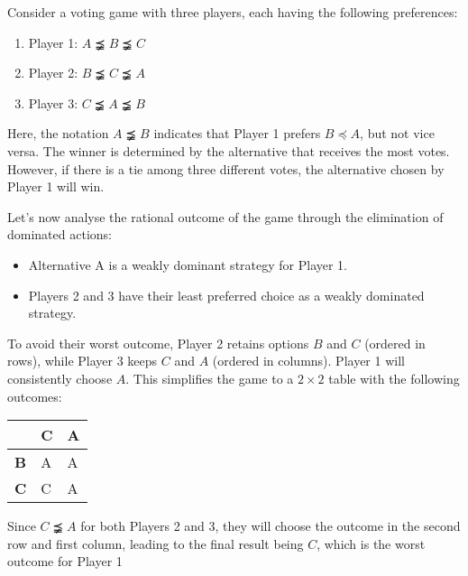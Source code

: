 \begin{example}
    Consider a voting game with three players, each having the following preferences:
    \begin{enumerate}
        \item Player 1: $A \precneqq B \precneqq C$
        \item Player 2: $B \precneqq C \precneqq A$
        \item Player 3: $C \precneqq A \precneqq B$
    \end{enumerate}
    Here, the notation $A \precneqq B$ indicates that Player 1 prefers $B \preceq A$, but not vice versa. 
    The winner is determined by the alternative that receives the most votes. 
    However, if there is a tie among three different votes, the alternative chosen by Player 1 will win.

    Let's now analyse the rational outcome of the game through the elimination of dominated actions:
    \begin{itemize}
        \item Alternative A is a weakly dominant strategy for Player 1.
        \item Players 2 and 3 have their least preferred choice as a weakly dominated strategy.
    \end{itemize}
    To avoid their worst outcome, Player 2 retains options $B$ and $C$ (ordered in rows), while Player 3 keeps $C$ and $A$ (ordered in columns). 
    Player 1 will consistently choose $A$. 
    This simplifies the game to a $2 \times 2$ table with the following outcomes:
    \begin{table}[H]
        \centering
        \begin{tabular}{l|ll|}
        \cline{2-3}
        \textbf{}                        & \textbf{C} & \textbf{A} \\ \hline
        \multicolumn{1}{|l|}{\textbf{B}} & A          & A          \\
        \multicolumn{1}{|l|}{\textbf{C}} & C          & A          \\ \hline
        \end{tabular}
    \end{table}
    Since $C \precneqq A$ for both Players 2 and 3, they will choose the outcome in the second row and first column, leading to the final result being $C$, which is the worst outcome for Player 1
\end{example}